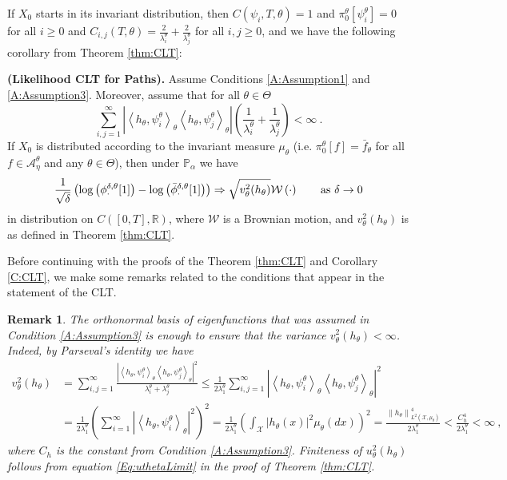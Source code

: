 \documentclass{article}
\newtheorem{remark}{ Remark}
\begin{document}
If $X_0$ starts in its invariant distribution, then $C(\psi_{i},T,\theta) = 1$ and $\pi^{\theta}_{0}[\psi_{i}^{\theta}]=0$ for all $i\geq 0$ and $C_{i,j}(T,\theta) = \frac{2}{\lambda_i^{\theta}}+\frac{2}{\lambda_j^{\theta}}$ for all $i,j\geq 0$, and we have the following corollary from Theorem \ref{thm:CLT}:
\begin{corollary}\textbf{(Likelihood CLT for Paths).}\label{C:CLT}
Assume Conditions \ref{A:Assumption1} and \ref{A:Assumption3}. Moreover, assume that  for all $\theta\in\Theta$
\[
\sum_{i,j=1}^{\infty}|\left<h_{\theta},\psi_i^{\theta}\right>_{\theta}\left<h_{\theta},\psi_j^{\theta}\right>_{\theta}|\left(\frac{1}{\lambda_i^{\theta}}+\frac{1}{\lambda_j^{\theta}}\right)<\infty\ .
\]
If $X_{0}$ is distributed according to the invariant measure $\mu_\theta$ (i.e. $\pi_0^\theta[f] = \bar f_\theta$ for all $f\in\mathcal A_\eta^\theta$ and any $\theta\in\Theta$), then under $\mathbb P_\alpha$ we have
\[\frac{1}{\sqrt\delta}\left(\log\left( \phi^{\delta,\theta}_{\cdot}[1]\right)-\log\left( \bar\phi^{\delta,\theta}_{\cdot}[1]\right)\right)\Rightarrow\sqrt{v^{2}_{\theta}(h_{\theta})}\mathcal W\left(\cdot\right)\qquad\hbox{as }\delta\rightarrow 0 \]
in distribution on $C([0,T],\mathbb R)$, where $\mathcal W$ is a Brownian motion, and $v_\theta^2(h_\theta)$ is as defined in Theorem \ref{thm:CLT}.
\end{corollary}

Before continuing with the proofs of the Theorem \ref{thm:CLT} and Corollary \ref{C:CLT}, we make some remarks related to the conditions that appear in the statement of the CLT.

\begin{remark}\label{R:AssumptionOnVariance}
The orthonormal basis of eigenfunctions that was assumed in Condition \ref{A:Assumption3} is enough to ensure that the variance $v_\theta^2(h_\theta)<\infty$. Indeed, by Parseval's identity we have
\begin{align*}v^{2}_{\theta}(h_{\theta})&= \sum_{i,j=1}^{\infty}\frac{\left|\left<h_{\theta},\psi_i^{\theta}\right>_{\theta}\left<h_{\theta},\psi_j^{\theta}\right>_{\theta}\right|^{2}}{\lambda_i^{\theta}+\lambda_j^{\theta}}\leq \frac{1}{2\lambda_1^\theta}\sum_{i,j=1}^{\infty}\left|\left<h_{\theta},\psi_i^{\theta}\right>_{\theta}\left<h_{\theta},\psi_j^{\theta}\right>_{\theta}\right|^{2}\\
& = \frac{1}{2\lambda_1^\theta}\left(\sum_{i=1}^{\infty}\left|\left<h_{\theta},\psi_i^{\theta}\right>_{\theta}\right|^{2}\right)^2=\frac{1}{2\lambda_1^\theta}\left(\int_{\mathcal{X}} |h_\theta(x)|^2\mu_\theta(dx)\right)^2 = \frac{\left\|h_{\theta}\right\|^{4}_{L^{2}(\mathcal{X},\mu_{\theta})}}{2\lambda_1^\theta}<\frac{C_h^4}{2\lambda_1^\theta}<\infty \ ,
\end{align*}
where $C_h$ is the constant from Condition \ref{A:Assumption3}. Finiteness of $u_\theta^2(h_\theta)$ follows from equation \eqref{Eq:uthetaLimit} in the proof of Theorem \ref{thm:CLT}.
\end{remark}
\end{document}

